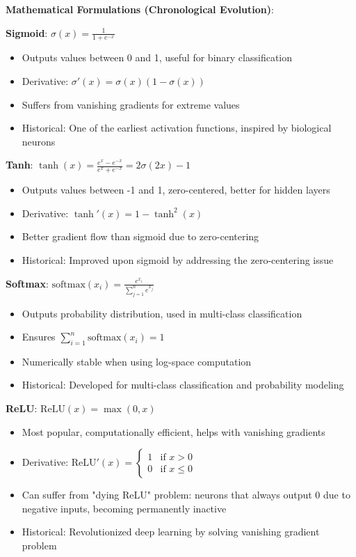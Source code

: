 \textbf{Mathematical Formulations (Chronological Evolution)}:

\textbf{Sigmoid}: $\sigma(x) = \frac{1}{1 + e^{-x}}$
\begin{itemize}
	\item Outputs values between 0 and 1, useful for binary classification
	\item Derivative: $\sigma'(x) = \sigma(x)(1 - \sigma(x))$
	\item Suffers from vanishing gradients for extreme values
	\item Historical: One of the earliest activation functions, inspired by biological neurons
\end{itemize}

\textbf{Tanh}: $\tanh(x) = \frac{e^x - e^{-x}}{e^x + e^{-x}} = 2\sigma(2x) - 1$
\begin{itemize}
	\item Outputs values between -1 and 1, zero-centered, better for hidden layers
	\item Derivative: $\tanh'(x) = 1 - \tanh^2(x)$
	\item Better gradient flow than sigmoid due to zero-centering
	\item Historical: Improved upon sigmoid by addressing the zero-centering issue
\end{itemize}

\textbf{Softmax}: $\text{softmax}(x_i) = \frac{e^{x_i}}{\sum_{j=1}^{n} e^{x_j}}$
\begin{itemize}
	\item Outputs probability distribution, used in multi-class classification
	\item Ensures $\sum_{i=1}^{n} \text{softmax}(x_i) = 1$
	\item Numerically stable when using log-space computation
	\item Historical: Developed for multi-class classification and probability modeling
\end{itemize}

\textbf{ReLU}: $\text{ReLU}(x) = \max(0, x)$
\begin{itemize}
	\item Most popular, computationally efficient, helps with vanishing gradients
	\item Derivative: $\text{ReLU}'(x) = \begin{cases} 1 & \text{if } x > 0 \\ 0 & \text{if } x \leq 0 \end{cases}$
	\item Can suffer from "dying ReLU" problem: neurons that always output 0 due to negative inputs, becoming permanently inactive
	\item Historical: Revolutionized deep learning by solving vanishing gradient problem
\end{itemize}

